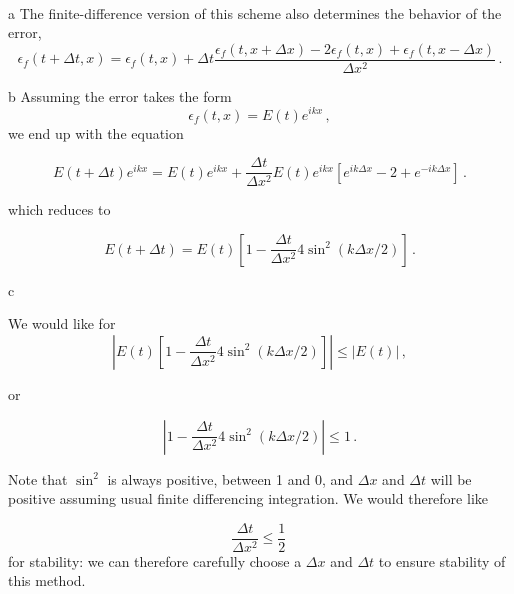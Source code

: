 \documentclass[]{homework}
\begin{document}

\begin{problem}{1}
  \,\\

  \begin{subproblem}{a}
  The
  finite-difference version of this scheme also determines the
  behavior of the error,
  \[
    \epsilon_f(t+\Delta t, x) = \epsilon_f(t, x) + \Delta t \frac{\epsilon_f(t, x+\Delta x) - 2 \epsilon_f(t, x) + \epsilon_f(t, x-\Delta x)}{\Delta x^2}\,.
  \]
  \end{subproblem}

  \begin{subproblem}{b}
    Assuming the error takes the form
    \[
      \epsilon_f(t, x) = E(t)e^{ikx}\,,
    \]
    we end up with the equation

    \[
      E(t+\Delta t)e^{ikx} = E(t)e^{ikx} + \frac{\Delta t}{\Delta x^2} E(t)e^{ikx} \left[e^{ik\Delta x} - 2 + e^{-ik\Delta x}\right]\,.
    \]

    which reduces to

    \[
      E(t+\Delta t) = E(t) \left[ 1 - \frac{\Delta t}{\Delta x^2} 4\sin^2(k\Delta x/2) \right]\,.
    \]

  \end{subproblem}

  \begin{subproblem}{c}

    We would like for
    \[
      \left|E(t) \left[ 1 - \frac{\Delta t}{\Delta x^2} 4\sin^2(k\Delta x/2) \right] \right| \le |E(t)|\,,
    \]

    or 

    \[
      \left|1 - \frac{\Delta t}{\Delta x^2} 4\sin^2(k\Delta x/2) \right| \le 1\,.
    \]

    Note that $\sin^2$ is always positive, between 1 and 0,
    and $\Delta x$ and $\Delta t$ will be positive
    assuming usual finite differencing integration. We would therefore like 

    \[
      \frac{\Delta t}{\Delta x^2} \le \frac{1}{2}\,
    \]
    for stability: we can therefore carefully choose a $\Delta x$ and $\Delta t$
    to ensure stability of this method.
    
  \end{subproblem}

\end{problem}
\end{document}
